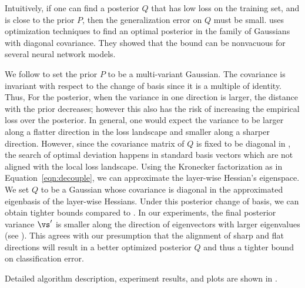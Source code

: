 Intuitively, if one can find a posterior $Q$ that has low loss on the training set, and is close to the prior $P$, then the generalization error on $Q$ must be small. \citet{dziugaite2017computing} uses optimization techniques to find an optimal posterior in the family of Gaussians with diagonal covariance. They showed that the bound can be nonvacuous for several neural network models.

We follow \citet{dziugaite2017computing} to set the prior $P$ to be a multi-variant Gaussian. The covariance is invariant with respect to the change of basis since it is a multiple of identity. Thus, 
For the posterior, when the variance in one direction is larger, the distance with the prior decreases; however this also has the risk of increasing the empirical loss over the posterior. In general, one would expect the variance to be larger along a flatter direction in the loss landscape and smaller along a sharper direction.
However, since the covariance matrix of $Q$ is fixed to be diagonal in \citet{dziugaite2017computing}, the search of optimal deviation happens in standard basis vectors which are not aligned with the local loss landscape.
Using the Kronecker factorization as in Equation~\ref{eqn:decouple}, we can approximate the layer-wise Hessian's eigenspace. We set $Q$ to be a Gaussian whose covariance is diagonal in the approximated eigenbasis of the layer-wise Hessians.
Under this posterior change of basis, we can obtain tighter bounds compared to \citet{dziugaite2017computing}. In our experiments, the final posterior variance $\vs'$ is smaller along the direction of eigenvectors with larger eigenvalues (see ). This agrees with our presumption that the alignment of sharp and flat directions will result in a better optimized posterior $Q$ and thus a tighter bound on classification error.

Detailed algorithm description, experiment results, and plots are shown in .

